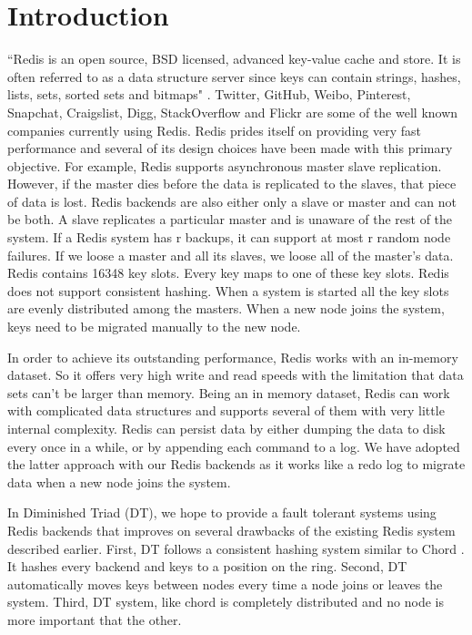 \documentclass[10pt,twocolumn,letterpaper]{article}
\begin{document}
\section{Introduction}
``Redis is an open source, BSD licensed, advanced key-value cache and store. It is often referred to as a data structure server since keys can contain strings, hashes, lists, sets, sorted sets and bitmaps"\cite{redis} . Twitter, GitHub, Weibo, Pinterest, Snapchat, Craigslist, Digg, StackOverflow and Flickr are some of the well known companies currently using Redis\cite{redis}. Redis prides itself on providing very fast performance and several of its design choices have been made with this primary objective. For example, Redis supports asynchronous master slave replication. However, if the master dies before the data is replicated to the slaves, that piece of data is lost. Redis backends are also either only a slave or master and can not be both. A slave replicates a particular master and is unaware of the rest of the system. If a Redis system has r backups, it can support at most r random node failures. If we loose a master and all its slaves, we loose all of the master's data. Redis contains 16348 key slots. Every key maps to one of these key slots. Redis does not support consistent hashing. When a system is started all the key slots are evenly distributed among the masters.  When a new node joins the system, keys need to be migrated manually to the new node.

In order to achieve its outstanding performance, Redis works with an in-memory dataset. So it offers very high write and read speeds with the limitation that data sets can't be larger than memory. Being an in memory dataset, Redis can work with complicated data structures and supports several of them with very little internal complexity. Redis can persist data by either dumping the data to disk every once in a while, or by appending each command to a log. We have adopted the latter approach with our Redis backends as it works like a redo log to migrate data when a new node joins the system. 

In Diminished Triad (DT), we hope to provide a fault tolerant systems using Redis backends that improves on several drawbacks of the existing Redis system described earlier. First,  DT follows a consistent hashing system similar to Chord \cite{chord}. It hashes every backend and keys to a position on the ring. Second, DT automatically moves keys between nodes every time a node joins or leaves the system. Third, DT system, like chord is completely distributed and no node is more important that the other. 
\end{document}
